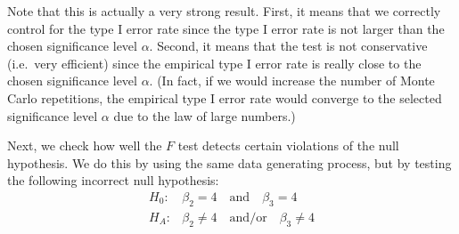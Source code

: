 \documentclass[
  14pt,
]{memoir}
\newenvironment{Shaded}{\begin{snugshade}}{\end{snugshade}}
\newcommand{\AttributeTok}[1]{\textcolor[rgb]{0.77,0.63,0.00}{#1}}
\newcommand{\CommentTok}[1]{\textcolor[rgb]{0.56,0.35,0.01}{\textit{#1}}}
\newcommand{\ConstantTok}[1]{\textcolor[rgb]{0.00,0.00,0.00}{#1}}
\newcommand{\ControlFlowTok}[1]{\textcolor[rgb]{0.13,0.29,0.53}{\textbf{#1}}}
\newcommand{\DecValTok}[1]{\textcolor[rgb]{0.00,0.00,0.81}{#1}}
\newcommand{\DocumentationTok}[1]{\textcolor[rgb]{0.56,0.35,0.01}{\textbf{\textit{#1}}}}
\newcommand{\FloatTok}[1]{\textcolor[rgb]{0.00,0.00,0.81}{#1}}
\newcommand{\FunctionTok}[1]{\textcolor[rgb]{0.00,0.00,0.00}{#1}}
\newcommand{\NormalTok}[1]{#1}
\newcommand{\OtherTok}[1]{\textcolor[rgb]{0.56,0.35,0.01}{#1}}
\newcommand{\SpecialCharTok}[1]{\textcolor[rgb]{0.00,0.00,0.00}{#1}}
\newcommand{\StringTok}[1]{\textcolor[rgb]{0.31,0.60,0.02}{#1}}
\begin{document}
Note that this is actually a very strong result. First, it means that we correctly control for the type I error rate since the type I error rate is not larger than the chosen significance level \(\alpha\). Second, it means that the test is not conservative (i.e.~very efficient) since the empirical type I error rate is really close to the chosen significance level \(\alpha\). (In fact, if we would increase the number of Monte Carlo repetitions, the empirical type I error rate would converge to the selected significance level \(\alpha\) due to the law of large numbers.)

Next, we check how well the \(F\) test detects certain violations of the null hypothesis. We do this by using the same data generating process, but by testing the following incorrect null hypothesis:
\begin{align*}
H_0:&\beta_2=4\quad\text{and}\quad\beta_3=4\\
H_A:&\beta_2\neq 4\quad\text{and/or}\quad\beta_3\neq 4
\end{align*}

\begin{Shaded}
\end{Shaded}
\end{document}
